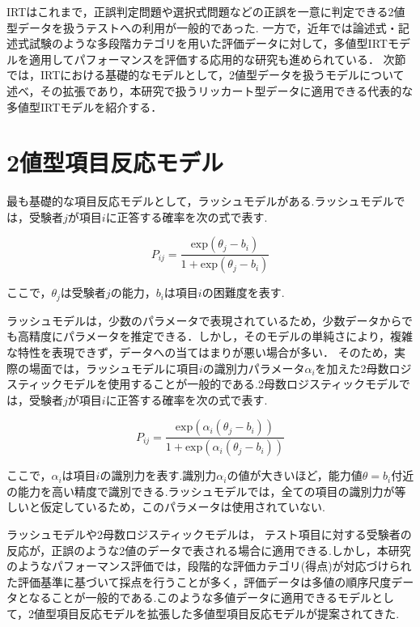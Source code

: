 \documentclass[a4paper,11pt,oneside,openany]{jsbook}
\begin{document}
IRTはこれまで，正誤判定問題や選択式問題などの正誤を一意に判定できる2値型データを扱うテストへの利用が一般的であった. 一方で，近年では論述式・記述式試験のような多段階カテゴリを用いた評価データに対して，多値型IRTモデルを適用してパフォーマンスを評価する応用的な研究も進められている\cite{IRTMatteucci,IRTDeCarlo}．
次節では，IRTにおける基礎的なモデルとして，2値型データを扱うモデルについて述べ，その拡張であり，本研究で扱うリッカート型データに適用できる代表的な多値型IRTモデルを紹介する．

\section{2値型項目反応モデル}
最も基礎的な項目反応モデルとして，ラッシュモデル\cite{rash}がある.ラッシュモデルでは，受験者$j$が項目$i$に正答する確率を次の式で表す.

\begin{displaymath}
P_{ij} = \frac{\mathrm{exp}(\theta_{j}-b_{i})}{1 + \mathrm{exp}(\theta_{j}-b_{i})}
\end{displaymath}

ここで，$\theta_{j}$は受験者$j$の能力，$b_{i}$は項目$i$の困難度を表す.

ラッシュモデルは，少数のパラメータで表現されているため，少数データからでも高精度にパラメータを推定できる\cite{rashbenefit}．しかし，そのモデルの単純さにより，複雑な特性を表現できず，データへの当てはまりが悪い場合が多い\cite{rashloss}．
そのため，実際の場面では，ラッシュモデルに項目$i$の識別力パラメータ$\alpha_{i}$を加えた2母数ロジスティックモデルを使用することが一般的である.2母数ロジスティックモデルでは，受験者$j$が項目$i$に正答する確率を次の式で表す.

\begin{displaymath}
  P_{ij} = \frac{\mathrm{exp}(\alpha_{i}(\theta_{j}-b_{i}))}{1 + \mathrm{exp}(\alpha_{i}(\theta_{j}-b_{i}))}
  \end{displaymath}
  
ここで，$\alpha_{i}$は項目$i$の識別力を表す.識別力$\alpha_{i}$の値が大きいほど，能力値$\theta = b_i$付近の能力を高い精度で識別できる.ラッシュモデルでは，全ての項目の識別力が等しいと仮定しているため，このパラメータは使用されていない.

ラッシュモデルや2母数ロジスティックモデルは， テスト項目に対する受験者の反応が，正誤のような2値のデータで表される場合に適用できる.しかし，本研究のようなパフォーマンス評価では，段階的な評価カテゴリ(得点)が対応づけられた評価基準に基づいて採点を行うことが多く，評価データは多値の順序尺度データとなることが一般的である.このような多値データに適用できるモデルとして，2値型項目反応モデルを拡張した多値型項目反応モデルが提案されてきた.
\end{document}
